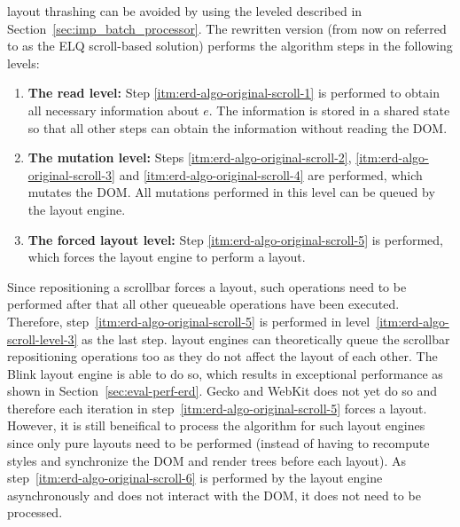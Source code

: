 \documentclass[a4paper,11pt]{kth-mag}
\begin{document}
        \Gls{layout thrashing} can be avoided by using the leveled  described in Section~\ref{sec:imp_batch_processor}.
        The rewritten version (from now on referred to as the \gls{ELQ} scroll-based solution) performs the algorithm steps in the following levels:
        \begin{enumerate}
          \item\label{itm:erd-algo-scroll-level-1}
            \textbf{The read level:}
            Step \ref{itm:erd-algo-original-scroll-1} is performed to obtain all necessary information about $e$.
            The information is stored in a shared state so that all other steps can obtain the information without reading the \gls{DOM}.
          \item\label{itm:erd-algo-scroll-level-2}
            \textbf{The mutation level:}
            Steps \ref{itm:erd-algo-original-scroll-2}, \ref{itm:erd-algo-original-scroll-3} and \ref{itm:erd-algo-original-scroll-4} are performed, which mutates the \gls{DOM}.
            All mutations performed in this level can be queued by the \gls{layout engine}.
          \item\label{itm:erd-algo-scroll-level-3}
            \textbf{The forced layout level:}
            Step \ref{itm:erd-algo-original-scroll-5} is performed, which forces the \gls{layout engine} to perform a layout.
        \end{enumerate}
        Since repositioning a scrollbar forces a layout, such operations need to be performed after that all other queueable operations have been executed.
        Therefore, step~\ref{itm:erd-algo-original-scroll-5} is performed in level~\ref{itm:erd-algo-scroll-level-3} as the last step.
        \Glspl{layout engine} can theoretically queue the scrollbar repositioning operations too as they do not affect the layout of each other.
        The \gls{Blink} \gls{layout engine} is able to do so, which results in exceptional performance as shown in Section~\ref{sec:eval-perf-erd}.
        \gls{Gecko} and \gls{WebKit} does not yet do so and therefore each iteration in step~\ref{itm:erd-algo-original-scroll-5} forces a layout.
        However, it is still beneifical to  process the algorithm for such \glspl{layout engine} since only pure layouts need to be performed (instead of having to recompute styles and synchronize the \gls{DOM} and \glspl{render tree} before each layout).        
        As step~\ref{itm:erd-algo-original-scroll-6} is performed by the \gls{layout engine} asynchronously and does not interact with the \gls{DOM}, it does not need to be  processed.
\end{document}
